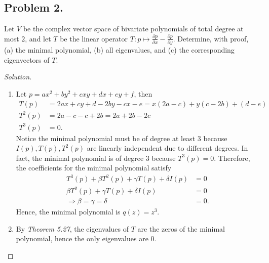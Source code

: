 \documentclass{article}
\renewcommand*{\implies}{\ensuremath{\Longrightarrow}}
\begin{document}
\newpage
\subsection*{Problem 2.}
Let $V$ be the complex vector space of bivariate polynomials of total degree at most $2$, and let $T$ be the linear operator 
$T : p\mapsto {\frac{\partial p}{\partial x}} -{\frac{\partial p}{\partial y}}$. 
Determine, with proof, (a) the minimal polynomial, (b) all eigenvalues, and (c) the corresponding eigenvectors of $T$.
\begin{proof}[Solution]\indent
    \begin{enumerate}[label=(\alph*)]
        \item Let $p = ax^2 + by^2 + cxy + dx + ey + f$, then 
        \begin{align*}
            T(p) & = 2ax + cy + d - 2by - cx - e = x(2a-c) + y(c-2b) + (d-e) \\
            T^2(p) & = 2a - c - c + 2b = 2a + 2b - 2c \\
            T^3(p) & = 0.
        \end{align*}
        Notice the minimal polynomial must be of degree at least 3 because $I(p), T(p), T^2(p)$ are 
        linearly independent due to different degrees. In fact, the minimal polynomial is of degree 
        3 because $T^3(p) = 0$. Therefore, the coefficients for the minimal polynomial satisfy
        \begin{align*}
            T^3(p) + \beta T^2(p) + \gamma T(p) + \delta I(p) & = 0 \\
            \beta T^2(p) + \gamma T(p) + \delta I(p) & = 0 \\
            \implies \beta = \gamma = \delta & = 0.
        \end{align*}
        Hence, the minimal polynomial is $q(z)=z^3$.
        
        \item By \emph{Theorem 5.27}, the eigenvalues of $T$ are the zeros of the minimal polynomial,
        hence the only eigenvalues are $0$.


\end{enumerate}
\end{proof}
\end{document}
